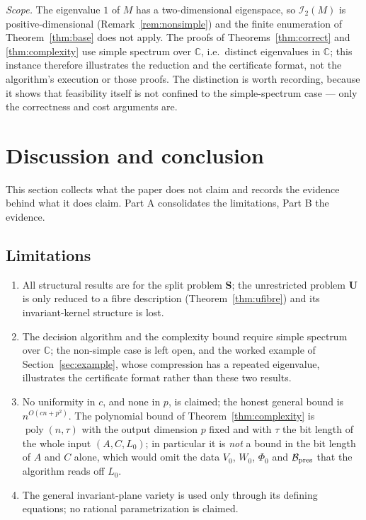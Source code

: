 \documentclass[journal]{IEEEtran}
\theoremstyle{plainn}
\theoremstyle{remark}
\newcommand{\poly}{\operatorname{poly}}
\begin{document}
\emph{Scope.} The eigenvalue $1$ of $M$ has a two-dimensional eigenspace, so $\mathcal I_2(M)$ is
positive-dimensional (Remark~\ref{rem:nonsimple}) and the finite enumeration of
Theorem~\ref{thm:base} does not apply. The proofs of Theorems~\ref{thm:correct} and
\ref{thm:complexity} use simple spectrum over $\mathbb C$, i.e.\ distinct eigenvalues in $\mathbb C$;
this instance therefore illustrates the reduction and the certificate format, not the algorithm's
execution or those proofs. The distinction is worth recording, because it shows that feasibility itself is
not confined to the simple-spectrum case --- only the correctness and cost arguments are.

\section{Discussion and conclusion}\label{sec:conclusion}

This section collects what the paper does not claim and records the evidence behind what it does claim.
Part A consolidates the limitations, Part B the evidence.

\subsection{Limitations}\label{sec:conclusion:limits}

\begin{enumerate}[label=\arabic*.,leftmargin=*,itemsep=1pt,topsep=2pt]
\item All structural results are for the split problem \textbf{S}; the unrestricted problem \textbf{U} is
only reduced to a fibre description (Theorem~\ref{thm:ufibre}) and its invariant-kernel structure is
lost.
\item The decision algorithm and the complexity bound require simple spectrum over $\mathbb C$; the
non-simple case is left open, and the worked example of Section~\ref{sec:example}, whose compression has
a repeated eigenvalue, illustrates the certificate format rather than these two results.
\item No uniformity in $c$, and none in $p$, is claimed; the honest general bound is $n^{O(cn+p^2)}$. The
polynomial bound of Theorem~\ref{thm:complexity} is $\poly(n,\tau)$ with the output dimension $p$ fixed and
with $\tau$ the bit length of the whole input $(A,C,L_0)$; in particular it is \emph{not} a bound in the bit
length of $A$ and $C$ alone, which would omit the data $V_0$, $W_0$, $\Phi_0$ and $\mathcal B_{\rm pres}$
that the algorithm reads off $L_0$.
\item The general invariant-plane variety is used only through its defining equations; no rational
parametrization is claimed.
\end{enumerate}
\end{document}
